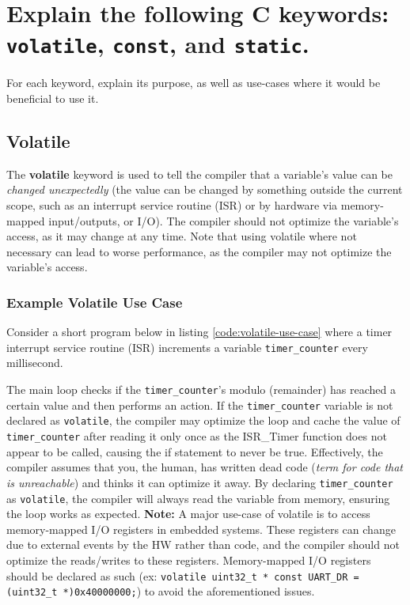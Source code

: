 \documentclass[main.tex]{subfiles}
\begin{document}
\section{Explain the following C keywords: \texttt{volatile}, \texttt{const}, and \texttt{static}.}
For each keyword, explain its purpose, as well as use-cases where it would be beneficial to use it.

\spoilerline

\subsection{Volatile}
The \textbf{volatile} keyword is used to tell the compiler that a variable's value can be \textit{changed unexpectedly} (the value can be changed by something outside the current scope, such as an interrupt service routine (ISR) or by hardware via memory-mapped input/outputs, or I/O). The compiler should not optimize the variable's access, as it may change at any time. Note that using volatile where not necessary can lead to worse performance, as the compiler may not optimize the variable's access. 

\subsubsection{Example Volatile Use Case}
Consider a short program below in listing \ref{code:volatile-use-case} where a timer interrupt service routine (ISR) increments a variable \texttt{timer\_counter} every millisecond. 



\noindent The main loop checks if the \texttt{timer\_counter}'s modulo (remainder) has reached a certain value and then performs an action. If the \texttt{timer\_counter} variable is not declared as \texttt{volatile}, the compiler may optimize the loop and cache the value of \texttt{timer\_counter} after reading it only once as the ISR\_Timer function does not appear to be called, causing the if statement to never be true. Effectively, the compiler assumes that you, the human, has written dead code (\textit{term for code that is unreachable}) and thinks it can optimize it away. By declaring \texttt{timer\_counter} as \texttt{volatile}, the compiler will always read the variable from memory, ensuring the loop works as expected.
\newline
\newline
\textbf{Note:} A major use-case of volatile is to access memory-mapped I/O registers in embedded systems. These registers can change due to external events by the HW rather than code, and the compiler should not optimize the reads/writes to these registers. Memory-mapped I/O registers should be declared as such (ex: \texttt{volatile uint32\_t * const UART\_DR = (uint32\_t *)0x40000000;}) to avoid the aforementioned issues.
\end{document}
